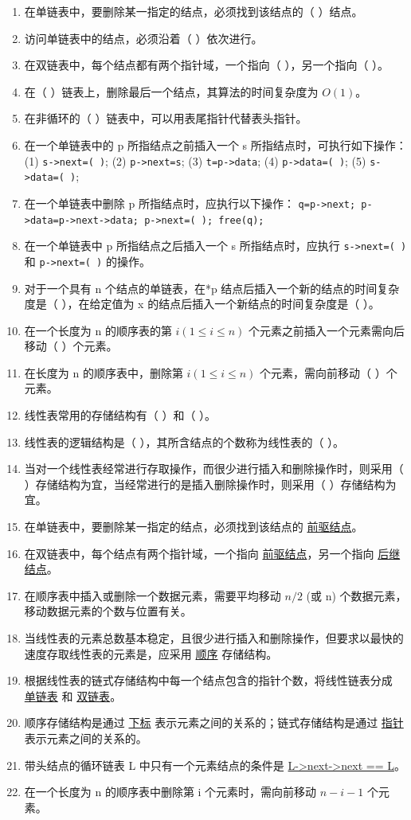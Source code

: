 \documentclass[12pt, a4paper]{article}
\begin{document}
\begin{enumerate}
	\item 在单链表中，要删除某一指定的结点，必须找到该结点的（ ）结点。
	\item 访问单链表中的结点，必须沿着（ ）依次进行。
	\item 在双链表中，每个结点都有两个指针域，一个指向（ ），另一个指向（ ）。
	\item 在（ ）链表上，删除最后一个结点，其算法的时间复杂度为 $O(1)$。
	\item 在非循环的（ ）链表中，可以用表尾指针代替表头指针。
	\item 在一个单链表中的 p 所指结点之前插入一个 s 所指结点时，可执行如下操作：
	      (1) \texttt{s->next=( )}; (2) \texttt{p->next=s}; (3) \texttt{t=p->data}; (4) \texttt{p->data=( )}; (5) \texttt{s->data=( )};
	\item 在一个单链表中删除 p 所指结点时，应执行以下操作：
	      \texttt{q=p->next; p->data=p->next->data; p->next=( ); free(q);}
	\item 在一个单链表中 p 所指结点之后插入一个 s 所指结点时，应执行 \texttt{s->next=( )} 和 \texttt{p->next=( )} 的操作。
	\item 对于一个具有 n 个结点的单链表，在*p 结点后插入一个新的结点的时间复杂度是（ ），在给定值为 x 的结点后插入一个新结点的时间复杂度是（ ）。
	\item 在一个长度为 n 的顺序表的第 $i (1 \le i \le n)$ 个元素之前插入一个元素需向后移动（ ）个元素。
	\item 在长度为 n 的顺序表中，删除第 $i (1 \le i \le n)$ 个元素，需向前移动（ ）个元素。
	\item 线性表常用的存储结构有（ ）和（ ）。
	\item 线性表的逻辑结构是（ ），其所含结点的个数称为线性表的（ ）。
	\item 当对一个线性表经常进行存取操作，而很少进行插入和删除操作时，则采用（ ）存储结构为宜，当经常进行的是插入删除操作时，则采用（ ）存储结构为宜。
	\item 在单链表中，要删除某一指定的结点，必须找到该结点的 \underline{前驱结点}。
	\item 在双链表中，每个结点有两个指针域，一个指向 \underline{前驱结点}，另一个指向 \underline{后继结点}。
	\item 在顺序表中插入或删除一个数据元素，需要平均移动 \underline{$n/2$} (或 n) 个数据元素，移动数据元素的个数与位置有关。
	\item 当线性表的元素总数基本稳定，且很少进行插入和删除操作，但要求以最快的速度存取线性表的元素是，应采用 \underline{顺序} 存储结构。
	\item 根据线性表的链式存储结构中每一个结点包含的指针个数，将线性链表分成 \underline{单链表} 和 \underline{双链表}。
	\item 顺序存储结构是通过 \underline{下标} 表示元素之间的关系的；链式存储结构是通过 \underline{指针} 表示元素之间的关系的。
	\item 带头结点的循环链表 L 中只有一个元素结点的条件是 \underline{L->next->next == L}。
	\item 在一个长度为 n 的顺序表中删除第 i 个元素时，需向前移动 \underline{$n-i-1$} 个元素。
\end{enumerate}
\end{document}
